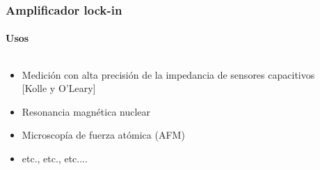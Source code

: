 \documentclass{beamer}
\begin{document}
\begin{frame}
\begin{columns}
\begin{column}{0.50\textwidth}
    \end{column}
  \end{columns}
\end{frame} 

\begin{frame}
\frametitle{Amplificador lock-in}
\framesubtitle{Usos}
\begin{columns}
\begin{column}{0.5\textwidth}
\begin{block}{}
\begin{itemize}[<+->]
\item Medición con alta precisión de la impedancia de sensores capacitivos
[Kolle y O’Leary]
\item Resonancia magnética nuclear
\item Microscopía de fuerza atómica (AFM)
\item etc., etc., etc.... 
\end{itemize}
\end{block}
\end{column}
\begin{column}{0.5\textwidth}
\begin{center}

\end{center}
\end{column}
\end{columns}
\end{frame}
\end{document}
